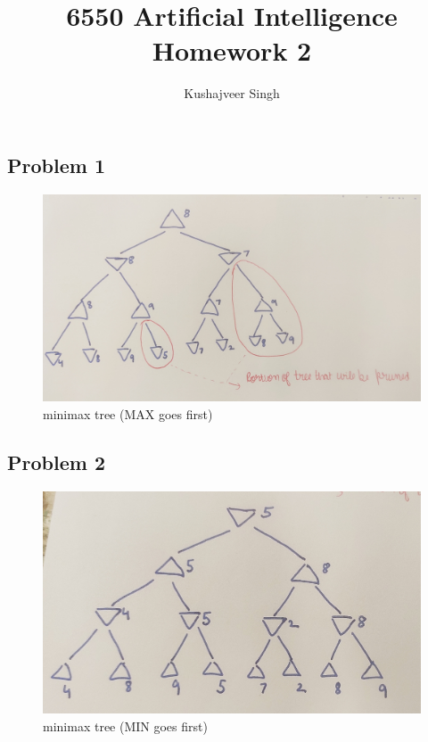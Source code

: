 \documentclass[12pt,a4paper]{article}
\title{6550 Artificial Intelligence Homework 2}
\author{Kushajveer Singh}
\date{}
\begin{document}
\maketitle

\subsection*{Problem 1}

\begin{figure}[H]
    \centering
    \includegraphics[width=13cm]{prob1.jpg}
    \caption{minimax tree (MAX goes first)}
\end{figure}

\subsection*{Problem 2}

\begin{figure}[H]
    \centering
    \includegraphics[width=14cm]{prob2.jpg}
    \caption{minimax tree (MIN goes first)}
\end{figure}
\end{document}
